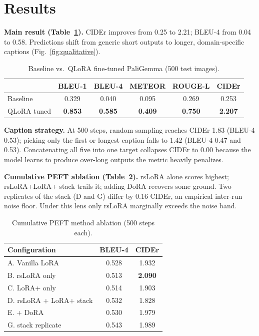 \documentclass[conference]{IEEEtran}
\begin{document}
\section{Results}

\textbf{Main result (Table~\ref{tab:main}).} CIDEr improves from 0.25 to 2.21; BLEU-4 from 0.04 to 0.58. Predictions shift from generic short outputs to longer, domain-specific captions (Fig.~\ref{fig:qualitative}).

\begin{table}[t]
\centering\small
\caption{Baseline vs.\ QLoRA fine-tuned PaliGemma (500 test images).}
\label{tab:main}
\renewcommand{\arraystretch}{1.0}
\begin{tabular}{lccccc}
\toprule
& BLEU-1 & BLEU-4 & METEOR & ROUGE-L & CIDEr \\
\midrule
Baseline    & 0.329 & 0.040 & 0.095 & 0.269 & 0.253 \\
QLoRA tuned & \textbf{0.853} & \textbf{0.585} & \textbf{0.409} & \textbf{0.750} & \textbf{2.207} \\
\bottomrule
\end{tabular}
\end{table}

\textbf{Caption strategy.} At 500 steps, random sampling reaches CIDEr 1.83 (BLEU-4 0.53); picking only the first or longest caption falls to 1.42 (BLEU-4 0.47 and 0.53). Concatenating all five into one target collapses CIDEr to 0.00 because the model learns to produce over-long outputs the metric heavily penalizes.

\textbf{Cumulative PEFT ablation (Table~\ref{tab:peft}).} rsLoRA alone scores highest; rsLoRA+LoRA+ stack trails it; adding DoRA \cite{liu2024dora} recovers some ground. Two replicates of the stack (D and G) differ by 0.16 CIDEr, an empirical inter-run noise floor. Under this lens only rsLoRA marginally exceeds the noise band.

\begin{table}[t]
\centering\small
\caption{Cumulative PEFT method ablation (500 steps each).}
\label{tab:peft}
\renewcommand{\arraystretch}{1.0}
\begin{tabular}{lcc}
\toprule
Configuration & BLEU-4 & CIDEr \\
\midrule
A. Vanilla LoRA          & 0.528 & 1.932 \\
B. rsLoRA only           & 0.513 & \textbf{2.090} \\
C. LoRA+ only            & 0.514 & 1.903 \\
D. rsLoRA + LoRA+ stack  & 0.532 & 1.828 \\
E. + DoRA                & 0.530 & 1.979 \\
G. stack replicate       & 0.543 & 1.989 \\
\bottomrule
\end{tabular}
\end{table}
\end{document}
